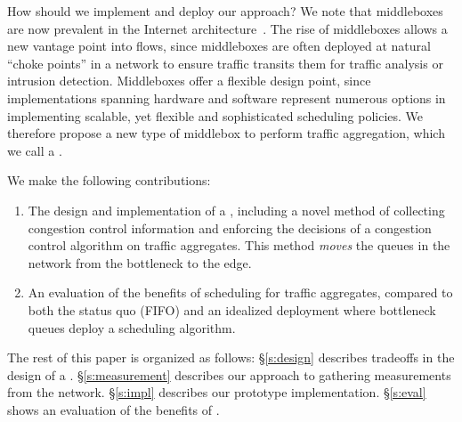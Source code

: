 {How should we implement and deploy our approach? 
We note that middleboxes are now prevalent in the Internet architecture~\cite{aplomb}.
The rise of middleboxes allows a new vantage point into flows, since middleboxes are often deployed at natural ``choke points''  in a network to ensure traffic transits them for \eg traffic analysis or intrusion detection.
Middleboxes offer a flexible design point, since implementations spanning hardware and software represent numerous options in implementing scalable, yet flexible and sophisticated scheduling policies.
We therefore propose a new type of middlebox to perform traffic aggregation, which we call a \name.

We make the following contributions:
\begin{enumerate}
    \item The design and implementation of a \name, including a novel method of collecting congestion control information and enforcing the decisions of a congestion control algorithm on traffic aggregates. This method \emph{moves} the queues in the network from the bottleneck to the edge.
    \item An evaluation of the benefits of scheduling for traffic aggregates, compared to both the status quo (FIFO) and an idealized deployment where bottleneck queues deploy a scheduling algorithm.
\end{enumerate}

The rest of this paper is organized as follows: 
\S\ref{s:design} describes tradeoffs in the design of a \name. 
\S\ref{s:measurement} describes our approach to gathering measurements from the network. 
\S\ref{s:impl} describes our prototype implementation. 
\S\ref{s:eval} shows an evaluation of the benefits of \name.


}
